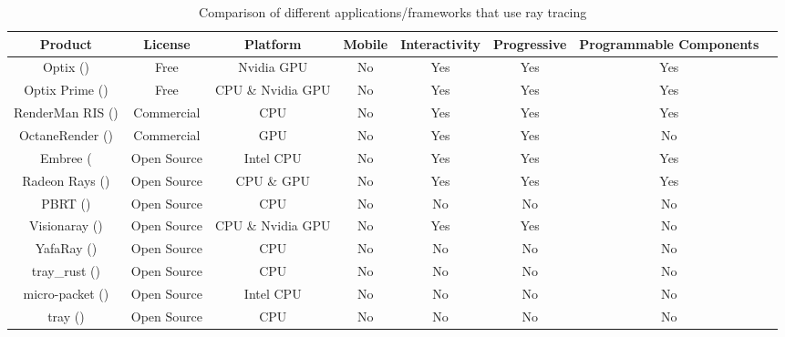 \begin{table}[H]
\centering
\caption{Comparison of different applications/frameworks that use ray tracing}
\label{comparison state of the art}
\hspace*{-3.0cm}
\scriptsize
\begin{tabular}{|c|c|c|c|c|c|c|c|}
\hline
\textbf{Product}											& \textbf{License}	& \textbf{Platform}	& \textbf{Mobile}		& \textbf{Interactivity}	& \textbf{Progressive}	& \textbf{Programmable Components}\\ \hline
Optix (\cite{Optix})											& Free                	& Nvidia GPU 			& No				& Yes                  	& Yes                 		& Yes\\ \hline
Optix Prime (\cite{OptixPrime})								& Free                	& CPU \& Nvidia GPU 	& No				& Yes                  	& Yes                 		& Yes\\ \hline
RenderMan RIS (\cite{RIS})									& Commercial       	& CPU 		             & No                  		& Yes                 		& Yes				& Yes\\ \hline
OctaneRender (\cite{OctaneRender})							& Commercial       	& GPU 		             & No                  		& Yes                 		& Yes				& No\\ \hline
Embree (\cite{Embree}										& Open Source     	& Intel CPU			& No				& Yes                  	& Yes                      	& Yes\\ \hline
Radeon Rays (\cite{RadeonRays})							& Open Source	& CPU \& GPU		& No				& Yes                    	& Yes                     	& Yes\\ \hline
PBRT (\cite{PBRT})	 									& Open Source	& CPU				& No                 		& No                 		& No				& No\\ \hline
Visionaray (\cite{Visionaray})									& Open Source     	& CPU \& Nvidia GPU	& No                  		& Yes				& Yes                  	& No\\ \hline
YafaRay	(\cite{YafaRay})									& Open Source     	& CPU 				& No                  		& No				& No                  		& No\\ \hline
tray\_rust (\cite{trayrust})									& Open Source    	& CPU                  	& No                   	& No                  		& No                 		& No\\ \hline
micro-packet (\cite{micro-packet})							& Open Source     	& Intel CPU 			& No                  		& No                  		& No 				& No\\ \hline
tray (\cite{tray})											& Open Source     	& CPU 				& No				& No                     	& No                  		& No\\ \hline

\end{tabular}
\end{table}
